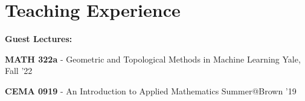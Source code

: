\documentclass[margin,line]{res}
\newenvironment{list1}{
  \begin{list}{\ding{113}}{
      \setlength{\itemsep}{0in}
      \setlength{\parsep}{0in} \setlength{\parskip}{0in}
      \setlength{\topsep}{0in} \setlength{\partopsep}{0in}
      \setlength{\leftmargin}{0.17in}}}{\end{list}}
\begin{document}
\begin{resume}
{\begin{itemize}

\end{itemize}
}


\section{\sc Teaching Experience}

\textbf{Guest Lectures:}
\vspace*{.2cm}

\begin{list1}
\setlength\itemsep{0.25em}
\item[] {\bf MATH 322a} - Geometric and Topological Methods in Machine Learning \hfill Yale, Fall '22
\item[] {\bf CEMA 0919} - An Introduction to Applied Mathematics \hfill Summer@Brown '19
\end{list1} 


\end{resume}
\end{document}

